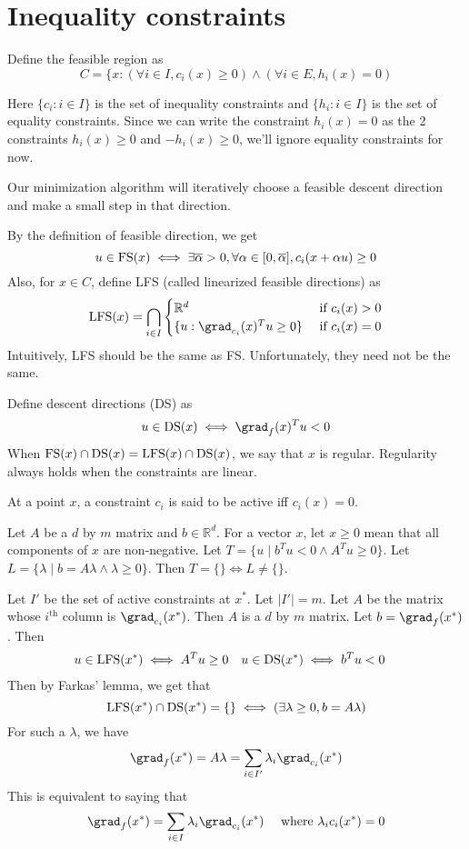 \section{Inequality constraints}

Define the feasible region as
\[ C = \{x: (\forall i \in I, c_i(x) \ge 0) \wedge (\forall i \in E, h_i(x) = 0) \]

Here $\{c_i: i \in I\}$ is the set of inequality constraints
and $\{h_i: i \in I\}$ is the set of equality constraints.
Since we can write the constraint $h_i(x) = 0$ as the 2 constraints
$h_i(x) \ge 0$ and $-h_i(x) \ge 0$, we'll ignore equality constraints for now.

Our minimization algorithm will iteratively choose a feasible descent direction
and make a small step in that direction.

By the definition of feasible direction, we get
\[ u \in \operatorname{FS}(x) \iff \exists \overline{\alpha} > 0, \forall \alpha \in [0, \overline{\alpha}],
c_i(x+\alpha u) \ge 0 \]
Also, for $x \in C$, define LFS (called linearized feasible directions) as
\[ \LFS(x) = \bigcap_{i \in I} \begin{cases} \mathbb{R}^d & \textrm{ if } c_i(x) > 0
\\ \{u: \grad_{c_i}(x)^Tu \ge 0\} & \textrm{ if } c_i(x) = 0 \end{cases} \]
Intuitively, LFS should be the same as FS.
Unfortunately, they need not be the same.

Define descent directions (DS) as
\[ u \in \DS(x) \iff \grad_f(x)^Tu < 0 \]
When $\operatorname{FS}(x) \cap \operatorname{DS}(x) = \operatorname{LFS}(x) \cap \operatorname{DS}(x)$, we say that $x$ is regular.
Regularity always holds when the constraints are linear.

At a point $x$, a constraint $c_i$ is said to be active iff $c_i(x) = 0$.

\begin{theorem}
Let $A$ be a $d$ by $m$ matrix and $b \in \mathbb{R}^d$.
For a vector $x$, let $x \ge 0$ mean that all components of $x$ are non-negative.
Let $T = \{u \mid b^Tu < 0 \wedge A^Tu \ge 0\}$.
Let $L = \{\lambda \mid b = A\lambda \wedge \lambda \ge 0\}$.
Then $T = \{\} \iff L \neq \{\}$.
\end{theorem}

Let $I'$ be the set of active constraints at $x^*$. Let $|I'| = m$.
Let $A$ be the matrix whose $i^{\textrm{th}}$ column is $\grad_{c_i}(x^*)$.
Then $A$ is a $d$ by $m$ matrix.
Let $b = \grad_f(x^*)$.
Then
\begin{align*}
u \in \operatorname{LFS}(x^*) &\iff A^Tu \ge 0 & u \in \operatorname{DS}(x^*) &\iff b^Tu < 0
\end{align*}
Then by Farkas' lemma, we get that
\[ \operatorname{LFS}(x^*) \cap \operatorname{DS}(x^*) = \{\} \iff (\exists \lambda \ge 0, b = A\lambda) \]
For such a $\lambda$, we have
\[ \grad_f(x^*) = A\lambda = \sum_{i \in I'} \lambda_i\grad_{c_i}(x^*) \]
This is equivalent to saying that
\[ \grad_f(x^*) = \sum_{i \in I} \lambda_i\grad_{c_i}(x^*) \quad \textrm{ where } \lambda_ic_i(x^*) = 0 \]

